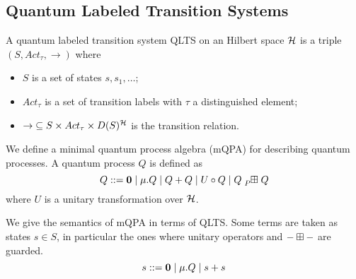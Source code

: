 %



\subsection{Quantum Labeled Transition Systems}

A quantum labeled transition system QLTS on an Hilbert space $\mathcal{H}$ is a triple $(S, Act_\tau, \rightarrow)$ where
\begin{itemize}
	\item $S$ is a set of states $s, s_1, \dots$;
	\item $Act_\tau$ is a set of transition labels with $\tau$ a distinguished element;
	\item $\rightarrow\;\subseteq S \times Act_\tau \times D(S)^{\mathcal{H}}$ is the transition relation. 
\end{itemize}

We define a minimal quantum process algebra (mQPA) for describing quantum processes.
A quantum process $Q$ is defined as
\[
Q ::= \nil \mid \mu.Q \mid Q + Q \mid U \circ Q \mid Q \qsum{P} Q
\]
where $U$ is a unitary transformation over $\mathcal{H}$.

We give the semantics of mQPA in terms of QLTS.
Some terms are taken as states $s \in S$, in particular the ones where unitary operators and ${-} \boxplus {-}$ are guarded.
\[
s ::= \mathbf{0} \mid \mu.Q \mid s + s
\]

